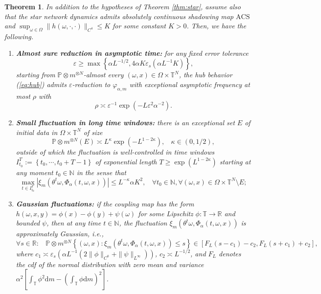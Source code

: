 \documentclass[a4paper]{article}
\theoremstyle{plain}
\newtheorem{theorem}{Theorem}[section] %
\theoremstyle{definition}
\newcommand{\PP}{\mathbb{P}}
\newcommand{\R}{\mathbb{R}}
\newcommand{\T}{\mathbb{T}}
\newcommand{\N}{\mathbb{N}}
\begin{document}
\begin{theorem}\label{thm:star_ACS}
	In addition to the hypotheses of Theorem \ref{thm:star}, assume also that the star network dynamics admits absolutely continuous shadowing map $\mathrm{ACS}$ and $\sup_{\omega\in\Omega} \|h(\omega,\cdot,\cdot)\|_{C^4}\leq K$ for some constant $K>0$. Then, we have the following.
	\begin{enumerate}
		\item[$\mathrm{(i)}$] \textbf{Almost sure reduction in asymptotic time:} for any fixed error tolerance $$\varepsilon\geq \max\left\{\alpha L^{-1/2}, 4\alpha K\varepsilon_s (\alpha L^{-1} K)\right\},$$
		starting from $\PP\otimes m^{\otimes N}$-almost every $(\omega,x)\in\Omega\times \T^N$, the hub behavior (\ref{eq:hub}) admits $\varepsilon$-reduction to $\varphi_{\alpha,m}$ with exceptional asymptotic frequency at most $\rho$ with
		$$ \rho\asymp \varepsilon^{-1} \exp(-L\varepsilon^2 \alpha^{-2}).$$ 
		\item[$\mathrm{(ii)}$] \textbf{Small fluctuation in long time windows:} there is an exceptional set $E$ of initial data in $\Omega\times \T^{N}$ of size 
		$$\PP\otimes m^{\otimes N}(E) \asymp L^{\kappa} \exp(-L^{1-2\kappa}),~~~~\kappa\in(0,1/2),$$ outside of which
		the fluctuation is well-controlled in time windows $I_{t_0}^T:=\left\{t_0,\cdots,t_0+T-1\right\}$ of exponential length $T\geq \exp( L^{1-2\kappa})$ starting at any moment $t_0\in\N$ in the sense that 
		$$\max_{t\in I_{t_0}^T} |\xi_{m}(\theta^t\omega, \Phi_{\alpha}(t,\omega,x))| \leq L^{-\kappa} \alpha K^2,~~~~\forall t_0\in\N,\forall (\omega,x)\in \Omega\times \T^N\setminus E;$$
		\item[$\mathrm{(iii)}$] \textbf{Gaussian fluctuations: } if the coupling map has the form $h(\omega,x,y)=\phi(x)-\phi(y)+\psi(\omega)$ for some Lipschitz $\phi:\T\to\R$ and bounded $\psi$, then at any time $t\in\N$, the fluctuation $\xi_{m}(\theta^t\omega, \Phi_{\alpha}(t,\omega,x))$ is approximately Gaussian, i.e.,
		$$\forall s\in\R:~~~~ \PP\otimes m^{\otimes N}\left\{(\omega,x): \xi_{m}(\theta^t\omega, \Phi_{\alpha}(t,\omega,x)) \leq s\right\} \in\left[ F_L\left( s -c_1\right)-c_2, F_L\left( s+c_1 \right) +c_2\right],$$
		where $c_1\asymp \varepsilon_s \left(\alpha L^{-1} \left( 2\|\phi\|_{C^0}+ \|\psi\|_{L^{\infty}} \right) \right)$, $c_2\asymp L^{-1/2}$, and	$F_L$ denotes the cdf of the normal distribution with zero mean and variance $\alpha^2 \left[\int_{\T}\phi^2\mathrm{d}m - \left(\int_{\T}\phi\mathrm{d}m\right)^2\right] $. 
	\end{enumerate}
\end{theorem}
\end{document}
